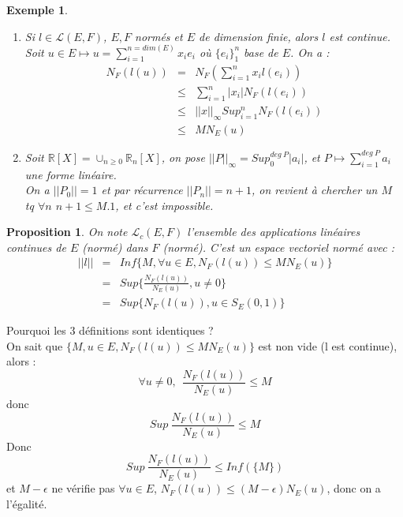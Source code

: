 \documentclass[a4paper, oneside]{report}
\theoremstyle{break}
\newtheorem{propo}[thm]{Proposition}
\newtheorem{exem}[thm]{Exemple}
\newcommand{\R}{\mathbb{R}}
\renewcommand{\L}{\mathcal{L}}
\newcommand{\evn}{espace vectoriel normé }
\newcommand{\aplins}{applications linéaires }
\begin{document}
\begin{exem}

\begin{enumerate}
\item Si $l\in \mathcal{L}(E,F)$, $E,F$ normés et $E$ de dimension finie, alors $l$ est continue.\\
Soit $u\in E\mapsto  u=\sum_{i=1}^{n=dim(E)}x_ie_i$ où $\{e_i\}^n_1$ base de $E$. On a :
$$\begin{array}{lll}
N_F(l(u))&=&N_F(\sum_{i=1}^{n}x_il(e_i))\\
&\leq & \sum_{i=1}^n |x_i| N_F(l(e_i))\\
&\leq & ||x||_\infty Sup_{i=1}^n N_F(l(e_i))\\
& \leq & M N_E(u)
\end{array}$$

\item Soit $\R[X]=\cup_{n\geq 0}\R_n[X]$, on pose $||P||_\infty = Sup_0^{deg~P}|a_i|$, et $P\mapsto \sum_{i=1}^{deg~P}a_i$ une forme linéaire.\\
On a $||P_0||=1$ et par récurrence $||P_n||=n+1$, on revient à chercher un $M$ tq $\forall n$ $n+1\leq M.1$, et c'est impossible.
\end{enumerate}
\end{exem}

\begin{propo}
On note $\L_c(E,F)$ l'ensemble des \aplins continues de $E$ (normé) dans $F$ (normé). C'est un \evn avec :
$$\begin{array}{lll}
||l||&=& Inf\{M, \forall u \in E, N_F(l(u))\leq M N_E(u) \}\\
&=& Sup\{\frac{N_F(l(u))}{N_E(u)}, u\neq 0 \}\\
&=& Sup\{N_F(l(u)), u \in S_E(0,1) \}
\end{array}$$
\end{propo}

Pourquoi les 3 définitions sont identiques ?\\
On sait que $\{M, u \in E, N_F(l(u))\leq M N_E(u) \}$ est non vide (l est continue), alors :
$$\forall u \neq 0,~~\frac{N_F(l(u))}{N_E(u)}\leq M$$
donc 
$$Sup~\frac{N_F(l(u))}{N_E(u)}\leq M$$
Donc 
$$Sup~\frac{N_F(l(u))}{N_E(u)}\leq Inf(\{M\})$$
et $M-\epsilon$ ne vérifie pas $\forall u \in E$, $N_F(l(u))\leq (M-\epsilon) N_E(u)$, donc on a l'égalité.
\end{document}
